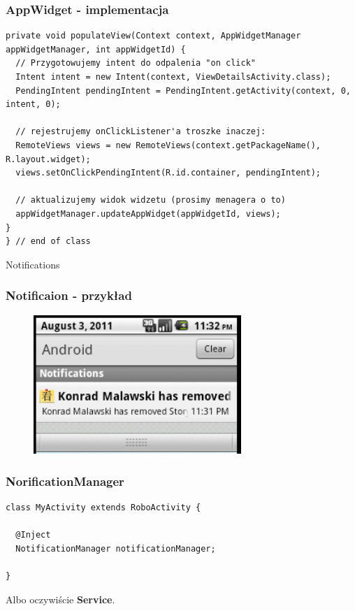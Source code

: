 \documentclass{beamer}
\begin{document}
\begin{frame}[fragile]\frametitle{AppWidget - implementacja}
\begin{lstlisting}
private void populateView(Context context, AppWidgetManager appWidgetManager, int appWidgetId) {
  // Przygotowujemy intent do odpalenia "on click"
  Intent intent = new Intent(context, ViewDetailsActivity.class);
  PendingIntent pendingIntent = PendingIntent.getActivity(context, 0, intent, 0);

  // rejestrujemy onClickListener'a troszke inaczej:
  RemoteViews views = new RemoteViews(context.getPackageName(), R.layout.widget);
  views.setOnClickPendingIntent(R.id.container, pendingIntent);
 
  // aktualizujemy widok widzetu (prosimy menagera o to)
  appWidgetManager.updateAppWidget(appWidgetId, views);
}
} // end of class
\end{lstlisting}
\end{frame}



\begin{frame}
\begin{center}
\Huge{Notifications}
\end{center}
\end{frame}

\begin{frame}\frametitle{Notificaion - przykład}
\begin{figure}
 \centering
 \includegraphics[width=0.7\textwidth]{images/notification_android_2_2}
\end{figure}
\end{frame}


\begin{frame}[fragile]\frametitle{NorificationManager}
\begin{lstlisting}
class MyActivity extends RoboActivity {
  
  @Inject
  NotificationManager notificationManager;

}
\end{lstlisting}
\pause Albo oczywiście \textbf{Service}.
\end{frame}
\end{document}
